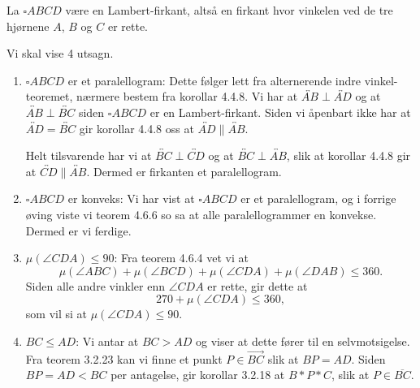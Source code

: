 \begin{oppgave}[4.8.8]
    La $\square ABCD$ være en Lambert-firkant, altså en firkant hvor vinkelen ved de tre hjørnene $A$, $B$ og $C$ er rette. 
    
    \begin{figure}
        
    \end{figure}

    Vi skal vise 4 utsagn.
    \begin{enumerate}
        \item $\square ABCD$ er et paralellogram: 
        Dette følger lett fra alternerende indre vinkel-teoremet, nærmere bestem fra korollar 4.4.8. 
        Vi har at $\overleftrightarrow{AB}\perp \overleftrightarrow{AD}$ og at $\overleftrightarrow{AB}\perp \overleftrightarrow{BC}$ siden $\square ABCD$ er en Lambert-firkant. 
        Siden vi åpenbart ikke har at $\overleftrightarrow{AD}=\overleftrightarrow{BC}$ gir korollar 4.4.8 oss at $\overleftrightarrow{AD}\parallel \overleftrightarrow{AB}$. 
        
        Helt tilsvarende har vi at $\overleftrightarrow{BC}\perp\overleftrightarrow{CD}$ og at $\overleftrightarrow{BC}\perp\overleftrightarrow{AB}$, slik at korollar 4.4.8  gir at $\overleftrightarrow{CD}\parallel\overleftrightarrow{AB}$. 
        Dermed er firkanten et paralellogram. 

        \item $\square ABCD$ er konveks: 
        Vi har vist at $\square ABCD$ er et paralellogram, og i forrige øving viste vi teorem 4.6.6 so sa at alle paralellogrammer en konvekse. 
        Dermed er vi ferdige. 

        \item $\mu(\angle CDA)\leq 90$: 
        Fra teorem 4.6.4 vet vi at 
        $$\mu(\angle ABC)+\mu(\angle BCD)+\mu(\angle CDA)+\mu(\angle DAB)\leq 360.$$
        Siden alle andre vinkler enn $\angle CDA$ er rette, gir dette at 
        $$270+\mu(\angle CDA)\leq 360,$$
        som vil si at $\mu(\angle CDA)\leq 90$. 

        \item $BC\leq AD$: 
        Vi antar at $BC> AD$ og viser at dette fører til en selvmotsigelse. 
        Fra teorem 3.2.23 kan vi finne et punkt $P\in \overrightarrow{BC}$ slik at $BP=AD$.
        Siden $BP=AD<BC$ per antagelse, gir korollar 3.2.18 at $B\ast P\ast C$, slik at $P\in \overline{BC}$. 

        \begin{figure}
            

\end{figure}
\end{enumerate}
\end{oppgave}

